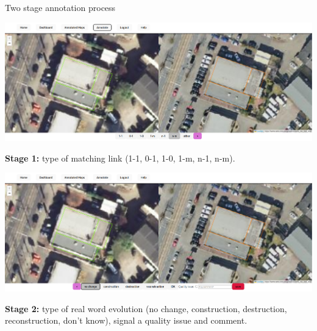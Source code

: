 \documentclass{beamer}
\begin{document}
\begin{frame}{Two stage annotation process}



\footnotesize

\begin{center}
  \includegraphics[width=0.65\linewidth]{figures/example_dortmund_nochange_stage1.png}
\end{center}

\textbf{Stage 1:} type of matching link (1-1, 0-1, 1-0, 1-m, n-1, n-m).

\smallskip

\begin{center}
  \includegraphics[width=0.65\linewidth]{figures/example_dortmund_nochange_stage2.png}
\end{center}

\textbf{Stage 2:} type of real word evolution (no change, construction, destruction, reconstruction, don't know), signal a quality issue and comment.



\end{frame}
\end{document}
